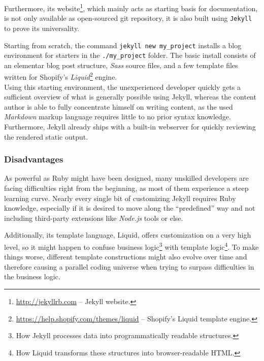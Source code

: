 Furthermore, its website\footnote{\url{http://jekyllrb.com} -- Jekyll website.}, which mainly acts as starting basis for documentation, is not only available as open-sourced git repository, it is also built using \texttt{Jekyll} to prove its universality.

Starting from scratch, the command \texttt{jekyll new my\_project} installs a blog environment for starters in the \texttt{./my\_project} folder. The basic install consists of an elementar blog post structure, \emph{Sass} source files, and a few template files written for Shopify's \emph{Liquid}\footnote{\url{https://help.shopify.com/themes/liquid} -- Shopify's Liquid template engine.} engine.\\
Using this starting environment, the unexperienced developer quickly gets a sufficient overview of what is generally possible using Jekyll, whereas the content author is able to fully concentrate himself on writing content, as the used \emph{Markdown} markup language requires little to no prior syntax knowledge. Furthermore, Jekyll already ships with a built-in webserver for quickly reviewing the rendered static output.

\subsubsection{Disadvantages}
As powerful as Ruby might have been designed, many unskilled developers are facing difficulties right from the beginning, as most of them experience a steep learning curve. Nearly every single bit of customizing Jekyll requires Ruby knowledge, especially if it is desired to move along the ``predefined'' way and not including third-party extensions like \emph{Node.js} tools or else.

Additionally, its template language, Liquid, offers customization on a very high level, so it might happen to confuse business logic\footnote{How Jekyll processes data into programmatically readable structures.} with template logic\footnote{How Liquid transforms these structures into browser-readable HTML.}. To make things worse, different template constructions might also evolve over time and therefore causing a parallel coding universe when trying to surpass difficulties in the business logic.


